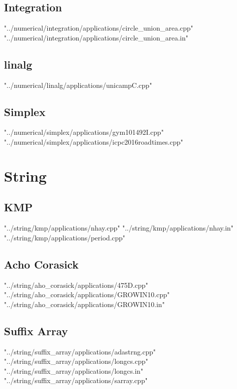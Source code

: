 \documentclass [12pt,onecolumn,oneside]{article}
\begin{document}
\subsection{ Integration}
 {"../numerical/integration/applications/circle_union_area.cpp"}
 {"../numerical/integration/applications/circle_union_area.in"}
\subsection{ linalg}
 {"../numerical/linalg/applications/unicampC.cpp"}
\subsection{ Simplex}
 {"../numerical/simplex/applications/gym101492I.cpp"}
 {"../numerical/simplex/applications/icpc2016roadtimes.cpp"}
\newpage

\section{String}
\subsection{ KMP}
 {"../string/kmp/applications/nhay.cpp"}
 {"../string/kmp/applications/nhay.in"}
 {"../string/kmp/applications/period.cpp"}
\subsection{ Acho Corasick}
 {"../string/aho_corasick/applications/475D.cpp"}
 {"../string/aho_corasick/applications/GROWIN10.cpp"}
 {"../string/aho_corasick/applications/GROWIN10.in"}
\subsection{ Suffix Array}
 {"../string/suffix_array/applications/adastrng.cpp"}
 {"../string/suffix_array/applications/longcs.cpp"}
 {"../string/suffix_array/applications/longcs.in"}
 {"../string/suffix_array/applications/sarray.cpp"}
\newpage
\end{document}
